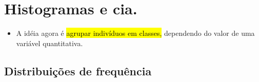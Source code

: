 \documentclass[
  11pt]{report}
\providecommand{\tightlist}{%
  \setlength{\itemsep}{0pt}\setlength{\parskip}{0pt}}
\begin{document}
\hypertarget{histogramas-e-cia.}{%
\section{Histogramas e cia.}\label{histogramas-e-cia.}}

\begin{itemize}
\tightlist
\item
  A idéia agora é {\hl{agrupar indivíduos em classes,}} dependendo do valor de uma variável quantitativa.
\end{itemize}

\hypertarget{distribuiuxe7uxf5es-de-frequuxeancia}{%
\subsection{Distribuições de frequência}\label{distribuiuxe7uxf5es-de-frequuxeancia}}
\end{document}
